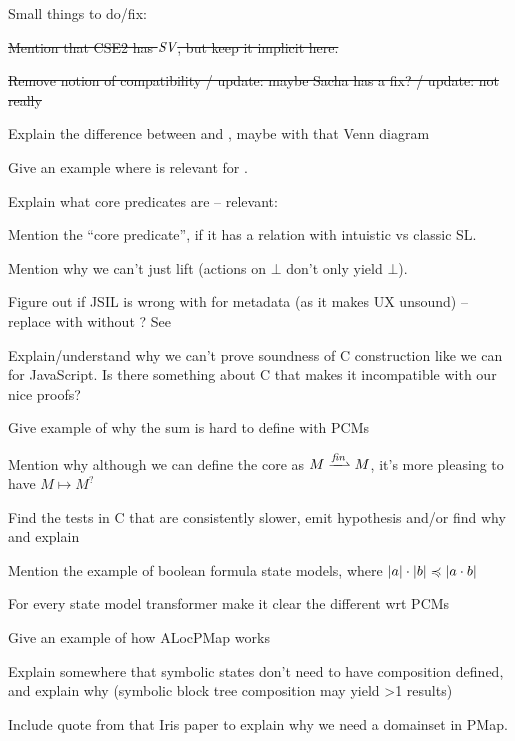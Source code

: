 Small things to do/fix: \begin{compactitem}
 \item \sout{Mention that CSE2 has $\textit{SV}$, but keep it implicit here.}
 \item \sout{Remove notion of compatibility / update: maybe Sacha has a fix? / update: not really}
 \item Explain the difference between \LFail{} and \Err{}, maybe with that Venn diagram
 \item Give an example where \Miss{} is relevant for \consume.
 \item Explain what core predicates are -- relevant: \cite{abstractseplogic}
 \item Mention the  ``core predicate'', if it has a relation with intuistic vs classic SL.
 \item Mention why we can't just lift \execac{} (actions on $\bot$ don't only yield $\bot$).
 \item Figure out if JSIL is wrong with \Ag{} for metadata (as it makes  UX unsound) -- replace with \Frac{} without \store{}? See \cite{towardsjs}
 \item Explain/understand why we can't prove soundness of C construction like we can for JavaScript. Is there something about C that makes it incompatible with our nice proofs?
 \item Give example of why the sum is hard to define with PCMs
 \item Mention why although we can define the core as $M\finmap M$, it's more pleasing to have $M\mapsto M^?$
 \item Find the tests in C that are consistently slower, emit hypothesis and/or find why and explain
 \item Mention the example of boolean formula state models, where $|a| \cdot |b| \preccurlyeq |a\cdot b|$
 \item For every state model transformer make it clear the different wrt PCMs
 \item Give an example of how ALocPMap works
 \item Explain somewhere that symbolic states don't need to have composition defined, and explain why (symbolic block tree composition may yield >1 results)
 \item Include quote from that Iris paper to explain why we need a domainset in PMap.
 \end{compactitem}
